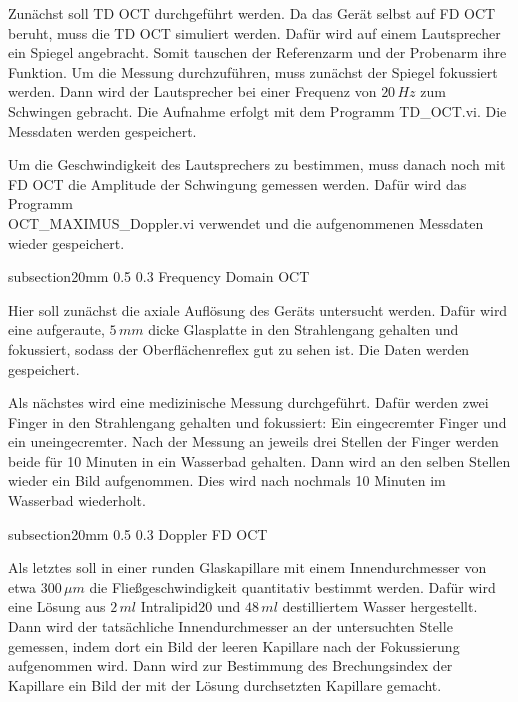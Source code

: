 \documentclass[german, %
parskip=full, %
bibliography=totoc, %
]{scrartcl}
\makeatletter
\renewcommand\subsection{\@startsection 
   {subsection}{2}{0mm}%
   {0.5\baselineskip}%
   {0.3\baselineskip}%
   {\bfseries\sffamily\large}%
   }
\makeatother
\begin{document}
Zunächst soll TD OCT durchgeführt werden. Da das Gerät selbst auf FD OCT beruht, muss die TD OCT simuliert werden. Dafür wird auf einem Lautsprecher ein Spiegel angebracht. Somit tauschen der Referenzarm und der Probenarm ihre Funktion. Um die Messung durchzuführen, muss zunächst der Spiegel fokussiert werden. Dann wird der Lautsprecher bei einer Frequenz von $20\,Hz$ zum Schwingen gebracht. Die Aufnahme erfolgt mit dem Programm TD\_OCT.vi. Die Messdaten werden gespeichert.

Um die Geschwindigkeit des Lautsprechers zu bestimmen, muss danach noch mit FD OCT die Amplitude der Schwingung gemessen werden. Dafür wird das Programm \\ OCT\_MAXIMUS\_Doppler.vi verwendet und die aufgenommenen Messdaten wieder gespeichert. 

\subsection{Frequency Domain OCT}

Hier soll zunächst die axiale Auflösung des Geräts untersucht werden. Dafür wird eine aufgeraute, $5\,mm$ dicke Glasplatte in den Strahlengang gehalten und fokussiert, sodass der Oberflächenreflex gut zu sehen ist. Die Daten werden gespeichert.

Als nächstes wird eine medizinische Messung durchgeführt. Dafür werden zwei Finger in den Strahlengang gehalten und fokussiert: Ein eingecremter Finger und ein uneingecremter. Nach der Messung an jeweils drei Stellen der Finger werden beide für 10 Minuten in ein Wasserbad gehalten. Dann wird an den selben Stellen wieder ein Bild aufgenommen. Dies wird nach nochmals 10 Minuten im Wasserbad wiederholt.

\subsection{Doppler FD OCT}

Als letztes soll in einer runden Glaskapillare mit einem Innendurchmesser von etwa $300\, \mu m$ die Fließgeschwindigkeit quantitativ bestimmt werden. Dafür wird eine Lösung aus $2\,ml$ Intralipid20 und $48\,ml$ destilliertem Wasser hergestellt. Dann wird der tatsächliche Innendurchmesser an der untersuchten Stelle gemessen, indem dort ein Bild der leeren Kapillare nach der Fokussierung aufgenommen wird. Dann wird zur Bestimmung des Brechungsindex der Kapillare ein Bild der mit der Lösung durchsetzten Kapillare gemacht. 
\end{document}
